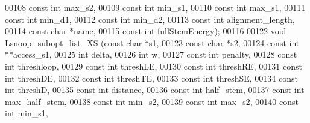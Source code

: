 \begin{DoxyCode}
00108                           \textcolor{keyword}{const} \textcolor{keywordtype}{int} max\_s2,
00109                           \textcolor{keyword}{const} \textcolor{keywordtype}{int} min\_s1,
00110                           \textcolor{keyword}{const} \textcolor{keywordtype}{int} max\_s1,
00111                           \textcolor{keyword}{const} \textcolor{keywordtype}{int} min\_d1,
00112                           \textcolor{keyword}{const} \textcolor{keywordtype}{int} min\_d2,
00113                           \textcolor{keyword}{const} \textcolor{keywordtype}{int} alignment\_length,
00114                           \textcolor{keyword}{const} \textcolor{keywordtype}{char} *name,
00115         \textcolor{keyword}{const} \textcolor{keywordtype}{int} fullStemEnergy);
00116 
00122 \textcolor{keywordtype}{void} Lsnoop\_subopt\_list\_XS (\textcolor{keyword}{const} \textcolor{keywordtype}{char} *s1,
00123                             \textcolor{keyword}{const} \textcolor{keywordtype}{char} *s2,
00124                             \textcolor{keyword}{const} \textcolor{keywordtype}{int} **access\_s1,
00125                             \textcolor{keywordtype}{int} delta,
00126                             \textcolor{keywordtype}{int} w, 
00127                             \textcolor{keyword}{const} \textcolor{keywordtype}{int} penalty,
00128                             \textcolor{keyword}{const} \textcolor{keywordtype}{int} threshloop, 
00129                             \textcolor{keyword}{const} \textcolor{keywordtype}{int} threshLE,
00130                             \textcolor{keyword}{const} \textcolor{keywordtype}{int} threshRE,
00131                             \textcolor{keyword}{const} \textcolor{keywordtype}{int} threshDE,
00132                             \textcolor{keyword}{const} \textcolor{keywordtype}{int} threshTE,
00133                             \textcolor{keyword}{const} \textcolor{keywordtype}{int} threshSE,
00134                             \textcolor{keyword}{const} \textcolor{keywordtype}{int} threshD,
00135                             \textcolor{keyword}{const} \textcolor{keywordtype}{int} distance,
00136                             \textcolor{keyword}{const} \textcolor{keywordtype}{int} half\_stem,
00137                             \textcolor{keyword}{const} \textcolor{keywordtype}{int} max\_half\_stem,
00138                             \textcolor{keyword}{const} \textcolor{keywordtype}{int} min\_s2,
00139                             \textcolor{keyword}{const} \textcolor{keywordtype}{int} max\_s2,
00140                             \textcolor{keyword}{const} \textcolor{keywordtype}{int} min\_s1,

\end{DoxyCode}
